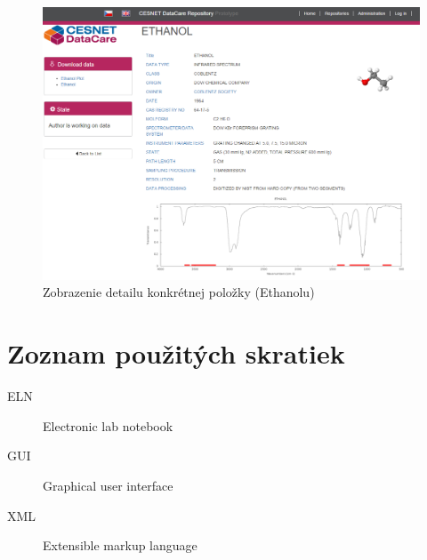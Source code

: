 \documentclass[thesis=M,slovak]{FITthesis}[2013/05/06]
\begin{document}
\begin{figure}\centering
	\includegraphics[width=1.0\textwidth]{grafika/detail_Ethanol.png}
 	\caption[Ethanol]{Zobrazenie detailu konkrétnej položky (Ethanolu)}\label{graphics:Ethanol}
\end{figure}


\begin{conclusion}
\end{conclusion}




\appendix

\chapter{Zoznam použitých skratiek}
\begin{description}
	\item[ELN] Electronic lab notebook
	\item[GUI] Graphical user interface
	\item[XML] Extensible markup language
\end{description}
\end{document}
